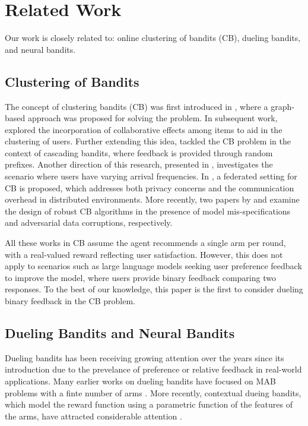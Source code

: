 \section{Related Work}
\vspace{-1.5mm}
Our work is closely related to: online clustering of bandits (CB), dueling bandits, and neural bandits.

\subsection{Clustering of Bandits}
The concept of clustering bandits (CB) was first introduced in \cite{gentile2014online}, where a graph-based approach was proposed for solving the problem. In subsequent work, \cite{li2016collaborative} explored the incorporation of collaborative effects among items to aid in the clustering of users. Further extending this idea, \cite{li2018online} tackled the CB problem in the context of cascading bandits, where feedback is provided through random prefixes. Another direction of this research, presented in \cite{10.5555/3367243.3367445}, investigates the scenario where users have varying arrival frequencies. In \cite{liu2022federated}, a federated setting for CB is proposed, which addresses both privacy concerns and the communication overhead in distributed environments. More recently, two papers by \cite{wang2024onlinea} and \cite{wang2024onlineb} examine the design of robust CB algorithms in the presence of model mis-specifications and adversarial data corruptions, respectively.

All these works in CB assume the agent recommends a single arm per round, with a real-valued reward reflecting user satisfaction. However, this does not apply to scenarios such as large language models seeking user preference feedback to improve the model, where users provide binary feedback comparing two responses. To the best of our knowledge, this paper is the first to consider dueling binary feedback in the CB problem.

\subsection{Dueling Bandits and Neural Bandits}
Dueling bandits has been receiving growing attention over the years since its introduction \cite{ICML09_yue2009interactively,ICML11_yue2011beat,JCSS12_yue2012k} due to the prevelance of preference or relative feedback in real-world applications.
Many earlier works on dueling bandits have focused on MAB problems with a finte number of arms \cite{WSDM14_zoghi2014relative,ICML14_ailon2014reducing,ICML14_zoghi2014relative,COLT15_komiyama2015regret,ICML15_gajane2015relative,UAI18_saha2018battle,AISTATS19_saha2019active,ALT19_saha2019pac,AISTATS22_saha2022exploiting,ICML23_zhu2023principled}.
More recently, contextual dueing bandits, which model the reward function using a parametric function of the features of the arms, have attracted considerable attention \cite{NeurIPS21_saha2021optimal,ALT22_saha2022efficient,ICML22_bengs2022stochastic,arXiv23_di2023variance,arXiv24_li2024feelgood,verma2024neural}.

